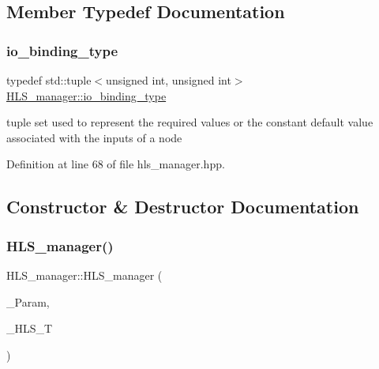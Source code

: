 \subsection{Member Typedef Documentation}
\mbox{\label{classHLS__manager_a972627cc658afa992590b9d2bf1a1e87}} 
\subsubsection{\texorpdfstring{io\+\_\+binding\+\_\+type}{io\_binding\_type}}
{\footnotesize\ttfamily typedef std\+::tuple$<$unsigned int, unsigned int$>$ \hyperlink{classHLS__manager_a972627cc658afa992590b9d2bf1a1e87}{H\+L\+S\+\_\+manager\+::io\+\_\+binding\+\_\+type}}



tuple set used to represent the required values or the constant default value associated with the inputs of a node 



Definition at line 68 of file hls\+\_\+manager.\+hpp.



\subsection{Constructor \& Destructor Documentation}
\mbox{\label{classHLS__manager_aa1e62cc57b722b661605ea798812ab79}} 
\subsubsection{\texorpdfstring{H\+L\+S\+\_\+manager()}{HLS\_manager()}}
{\footnotesize\ttfamily H\+L\+S\+\_\+manager\+::\+H\+L\+S\+\_\+manager (\begin{DoxyParamCaption}\item[{const \hyperlink{Parameter_8hpp_a37841774a6fcb479b597fdf8955eb4ea}{Parameter\+Const\+Ref}}]{\+\_\+\+Param,  }\item[{const \hyperlink{hls__target_8hpp_a390f1d55d3b31739665ff2776abe2a3f}{H\+L\+S\+\_\+target\+Ref}}]{\+\_\+\+H\+L\+S\+\_\+T }\end{DoxyParamCaption})}



